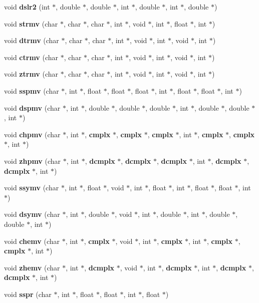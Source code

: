\begin{CompactItemize}
void {\bf dslr2} (int $\ast$, double $\ast$, double $\ast$, int $\ast$, double $\ast$, int $\ast$, double $\ast$)
\item 
void {\bf strmv} (char $\ast$, char $\ast$, char $\ast$, int $\ast$, void $\ast$, int $\ast$, float $\ast$, int $\ast$)
\item 
void {\bf dtrmv} (char $\ast$, char $\ast$, char $\ast$, int $\ast$, void $\ast$, int $\ast$, void $\ast$, int $\ast$)
\item 
void {\bf ctrmv} (char $\ast$, char $\ast$, char $\ast$, int $\ast$, void $\ast$, int $\ast$, void $\ast$, int $\ast$)
\item 
void {\bf ztrmv} (char $\ast$, char $\ast$, char $\ast$, int $\ast$, void $\ast$, int $\ast$, void $\ast$, int $\ast$)
\item 
void {\bf sspmv} (char $\ast$, int $\ast$, float $\ast$, float $\ast$, float $\ast$, int $\ast$, float $\ast$, float $\ast$, int $\ast$)
\item 
void {\bf dspmv} (char $\ast$, int $\ast$, double $\ast$, double $\ast$, double $\ast$, int $\ast$, double $\ast$, double $\ast$, int $\ast$)
\item 
void {\bf chpmv} (char $\ast$, int $\ast$, {\bf cmplx} $\ast$, {\bf cmplx} $\ast$, {\bf cmplx} $\ast$, int $\ast$, {\bf cmplx} $\ast$, {\bf cmplx} $\ast$, int $\ast$)
\item 
void {\bf zhpmv} (char $\ast$, int $\ast$, {\bf dcmplx} $\ast$, {\bf dcmplx} $\ast$, {\bf dcmplx} $\ast$, int $\ast$, {\bf dcmplx} $\ast$, {\bf dcmplx} $\ast$, int $\ast$)
\item 
void {\bf ssymv} (char $\ast$, int $\ast$, float $\ast$, void $\ast$, int $\ast$, float $\ast$, int $\ast$, float $\ast$, float $\ast$, int $\ast$)
\item 
void {\bf dsymv} (char $\ast$, int $\ast$, double $\ast$, void $\ast$, int $\ast$, double $\ast$, int $\ast$, double $\ast$, double $\ast$, int $\ast$)
\item 
void {\bf chemv} (char $\ast$, int $\ast$, {\bf cmplx} $\ast$, void $\ast$, int $\ast$, {\bf cmplx} $\ast$, int $\ast$, {\bf cmplx} $\ast$, {\bf cmplx} $\ast$, int $\ast$)
\item 
void {\bf zhemv} (char $\ast$, int $\ast$, {\bf dcmplx} $\ast$, void $\ast$, int $\ast$, {\bf dcmplx} $\ast$, int $\ast$, {\bf dcmplx} $\ast$, {\bf dcmplx} $\ast$, int $\ast$)
\item 
void {\bf sspr} (char $\ast$, int $\ast$, float $\ast$, float $\ast$, int $\ast$, float $\ast$)
\item 

\end{CompactItemize}
